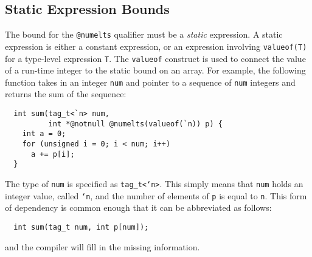 \subsection{Static Expression Bounds}

The bound for the \texttt{@numelts} qualifier 
must be a \emph{static} expression.  A static
expression is either a constant expression, or an expression involving
\texttt{valueof(T)} for a type-level expression \texttt{T}.  The
\texttt{valueof} construct is used to connect the value of a run-time
integer to the static bound on an array.  For example, the following
function takes in an integer \texttt{num} and pointer to a sequence
of \texttt{num} integers and returns the sum of the sequence:
\begin{verbatim}
  int sum(tag_t<`n> num, 
          int *@notnull @numelts(valueof(`n)) p) {
    int a = 0;
    for (unsigned i = 0; i < num; i++) 
      a += p[i];
  }
\end{verbatim}
The type of \texttt{num} is specified as \texttt{tag_t<`n>}.  This
simply means that \texttt{num} holds an integer value, called \texttt{`n},
and the number of elements of \texttt{p} is equal to \texttt{n}.  
This form of dependency is common enough that it can be abbreviated
as follows:
\begin{verbatim}
  int sum(tag_t num, int p[num]);
\end{verbatim}
and the compiler will fill in the missing information.  

